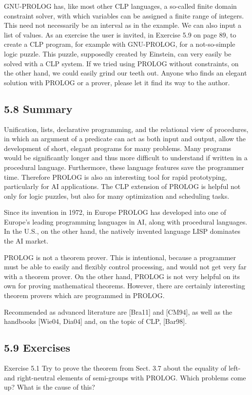 \documentclass[10pt]{book}
\begin{document}
\begin{center}
GNU-PROLOG has, like most other CLP languages, a so-called finite domain constraint solver, with which variables can be assigned a finite range of integers. This need not necessarily be an interval as in the example. We can also input a list of values. As an exercise the user is invited, in Exercise 5.9 on page 89, to create a CLP program, for example with GNU-PROLOG, for a not-so-simple logic puzzle. This puzzle, supposedly created by Einstein, can very easily be solved with a CLP system. If we tried using PROLOG without constraints, on the other hand, we could easily grind our teeth out. Anyone who finds an elegant solution with PROLOG or a prover, please let it find its way to the author.

\subsection*{5.8 Summary}
Unification, lists, declarative programming, and the relational view of procedures, in which an argument of a predicate can act as both input and output, allow the development of short, elegant programs for many problems. Many programs would be significantly longer and thus more difficult to understand if written in a procedural language. Furthermore, these language features save the programmer time. Therefore PROLOG is also an interesting tool for rapid prototyping, particularly for AI applications. The CLP extension of PROLOG is helpful not only for logic puzzles, but also for many optimization and scheduling tasks.

Since its invention in 1972, in Europe PROLOG has developed into one of Europe's leading programming languages in AI, along with procedural languages. In the U.S., on the other hand, the natively invented language LISP dominates the AI market.

PROLOG is not a theorem prover. This is intentional, because a programmer must be able to easily and flexibly control processing, and would not get very far with a theorem prover. On the other hand, PROLOG is not very helpful on its own for proving mathematical theorems. However, there are certainly interesting theorem provers which are programmed in PROLOG.

Recommended as advanced literature are [Bra11] and [CM94], as well as the handbooks [Wie04, Dia04] and, on the topic of CLP, [Bar98].

\subsection*{5.9 Exercises}
Exercise 5.1 Try to prove the theorem from Sect. 3.7 about the equality of left- and right-neutral elements of semi-groups with PROLOG. Which problems come up? What is the cause of this?


\end{center}
\end{document}
